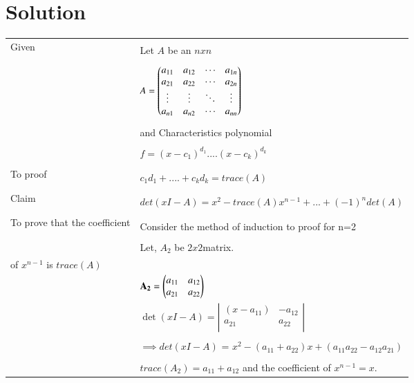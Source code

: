 \documentclass[journal,12pt]{IEEEtran}
\begin{document}
\section{\textbf{Solution}}
\renewcommand{\thetable}{1}
\begin{longtable}{|l|l|}
\hline
\multirow{3}{*}{Given} & \\
& Let $A$ be an $nxn$ \\
&\\
& $A = \begin{pmatrix}a_{11}&a_{12}&\cdots &a_{1n} \\
a_{21}&a_{22}&\cdots &a_{2n} \\
\vdots & \vdots & \ddots & \vdots\\
a_{n1}&a_{n2}&\cdots &a_{nn}\end{pmatrix}$\\
&\\
& and Characteristics polynomial\\
&\\
&  $f= (x-c_1)^{d_1}....(x-c_k)^{d_k}$\\
&\\
\hline
\multirow{3}{*}{To proof} & \\
& $c_1d_1+....+c_kd_k = trace(A)$\\
&\\
\hline
\multirow{3}{*}{Claim} & \\
&  $det(xI-A) = x^2 - trace(A)x^{n-1}+...+(-1)^ndet(A)$ \\
&\\
\hline
\multirow{3}{*}{To prove that the coefficient} &\\
& Consider the method of induction to proof for n=2\\ 
&\\
& Let, $A_2$ be $2x2$matrix.\\ 
of $x^{n-1}$ is $trace(A)$ 
&\\
& $\mathbf{A_2}=\begin{pmatrix}a_{11}&a_{12}\\a_{21}&a_{22}\end{pmatrix}$\\
& $\det(xI-A)= \left|
                \begin{array}{ccc}
                (x-a_{11}) & -a_{12}\\
                a_{21}& a_{22}\\
                \end{array} \right|$  \\
&\\
& $\implies det(xI-A)$ = $x^2 - (a_{11}+a_{22})x+(a_{11}a_{22}-a_{12}a_{21})$\\
 &\\
& $\boxed {trace(A_2) = a_{11}+a_{12}}$ and the coefficient of $\boxed{x^{n-1} = x}$.\\

\end{longtable}
\end{document}
